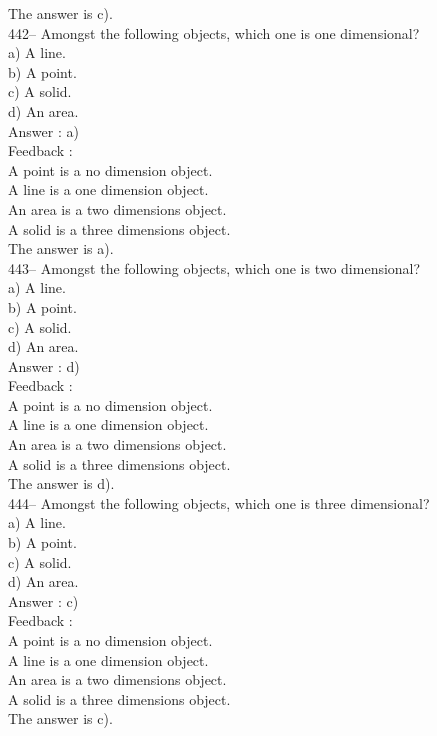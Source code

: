 ﻿\documentclass[letterpaper, 12pt]{article}
\begin{document}
The answer is c).\\


442-- Amongst the following objects, which one is one dimensional?\\
a) A line.\\
b) A point.\\
c) A solid.\\
d) An area.\\


Answer : a)\\

Feedback : \\

A point is a no dimension object.\\
A line is a one dimension object.\\
An area is a two dimensions object.\\
A solid is a three dimensions object.\\
The answer is a).\\

443-- Amongst the following objects, which one is two dimensional?\\
a) A line.\\
b) A point.\\
c) A solid.\\
d) An area.\\

Answer : d)\\

Feedback : \\
A point is a no dimension object.\\
A line is a one dimension object.\\
An area is a two dimensions object.\\
A solid is a three dimensions object.\\
The answer is d).\\

444-- Amongst the following objects, which one is three dimensional?\\
a) A line.\\
b) A point.\\
c) A solid.\\
d) An area.\\

Answer : c)\\

Feedback : \\
A point is a no dimension object.\\
A line is a one dimension object.\\
An area is a two dimensions object.\\
A solid is a three dimensions object.\\
The answer is c).\\
\end{document}
